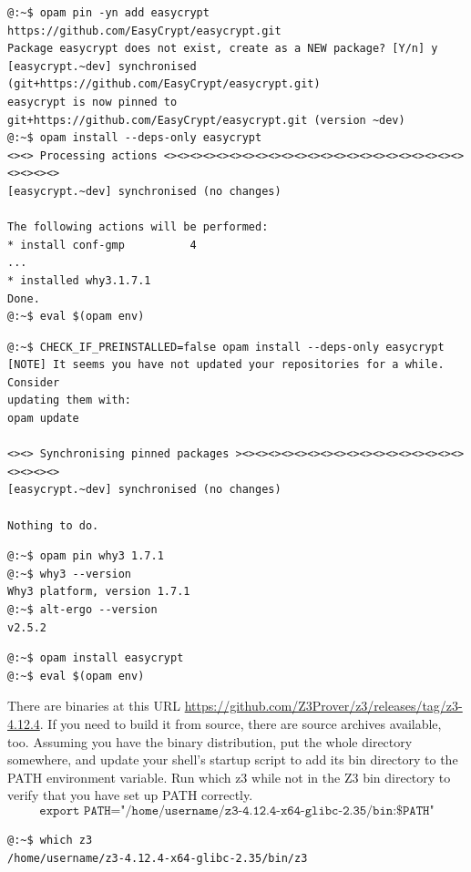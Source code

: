\begin{lstlisting}[style=normal]
@:~$ opam pin -yn add easycrypt https://github.com/EasyCrypt/easycrypt.git
Package easycrypt does not exist, create as a NEW package? [Y/n] y
[easycrypt.~dev] synchronised (git+https://github.com/EasyCrypt/easycrypt.git)
easycrypt is now pinned to git+https://github.com/EasyCrypt/easycrypt.git (version ~dev)
@:~$ opam install --deps-only easycrypt
<><> Processing actions <><><><><><><><><><><><><><><><><><><><><><><><><><><>
[easycrypt.~dev] synchronised (no changes)

The following actions will be performed:
* install conf-gmp          4
...
* installed why3.1.7.1
Done.
@:~$ eval $(opam env)
\end{lstlisting}

\begin{lstlisting}[style=normal]
@:~$ CHECK_IF_PREINSTALLED=false opam install --deps-only easycrypt
[NOTE] It seems you have not updated your repositories for a while. Consider
updating them with:
opam update

<><> Synchronising pinned packages ><><><><><><><><><><><><><><><><><><><><><>
[easycrypt.~dev] synchronised (no changes)

Nothing to do.
\end{lstlisting}

\newpage
\begin{lstlisting}[style=normal]
@:~$ opam pin why3 1.7.1
@:~$ why3 --version
Why3 platform, version 1.7.1
@:~$ alt-ergo --version
v2.5.2
\end{lstlisting}

\begin{lstlisting}[style=normal]
@:~$ opam install easycrypt
@:~$ eval $(opam env)
\end{lstlisting}

There are binaries at this URL \url{https://github.com/Z3Prover/z3/releases/tag/z3-4.12.4}. If you need to build it from source, there are source archives available, too. Assuming you have the binary distribution, put the whole directory somewhere, and update your shell's startup script to add its bin directory to the PATH environment variable. Run which z3 while not in the Z3 bin directory to verify that you have set up PATH correctly.
\[
\texttt{export PATH="/home/username/z3-4.12.4-x64-glibc-2.35/bin:\$PATH"}
\]
\begin{lstlisting}[style=normal]
@:~$ which z3
/home/username/z3-4.12.4-x64-glibc-2.35/bin/z3
\end{lstlisting}


